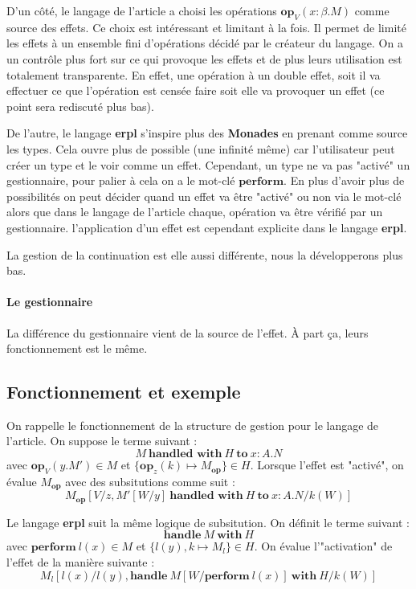 D'un côté, le langage de l'article a choisi les opérations $\textbf{op}_V(x:\beta.M)$ comme source des effets.
Ce choix est intéressant et limitant à la fois. Il permet de limité les effets à un ensemble fini d'opérations décidé par le créateur du langage. On a un contrôle plus fort sur ce qui provoque les effets et de plus leurs
utilisation est totalement transparente. En effet, une opération à un double effet, soit il va effectuer ce que l'opération
est censée faire soit elle va provoquer un effet (ce point sera rediscuté plus bas).

De l'autre, le langage \textbf{erpl} s'inspire plus des \textbf{Monades} en prenant comme source les types. Cela ouvre
plus de possible (une infinité même) car l'utilisateur peut créer un type et le voir comme un effet. Cependant, un type ne va
pas "activé" un gestionnaire, pour palier à cela on a le mot-clé $\textbf{perform}$. En plus d'avoir plus de possibilités
on peut décider quand un effet va être "activé" ou non via le mot-clé alors que dans le langage de l'article chaque, opération 
va être vérifié par un gestionnaire. l'application d'un effet est cependant explicite dans le langage \textbf{erpl}.

La gestion de la continuation est elle aussi différente, nous la développerons plus bas.

\paragraph{Le gestionnaire} La différence du gestionnaire vient de la source de l'effet. À part ça, leurs fonctionnement
est le même.

\subsection{Fonctionnement et exemple}

On rappelle le fonctionnement de la structure de gestion pour le langage de l'article. On suppose
le terme suivant : 
    \[M~\textbf{handled~with}~H~\textbf{to}~x:A.N\]
avec $\textbf{op}_V(y.M') \in M$ et $\{\textbf{op}_z(k) \mapsto M_\textbf{op}\} \in H$. Lorsque l'effet
est "activé", on évalue $M_\textbf{op}$ avec des subsitutions comme suit : 
    \[M_\textbf{op}[V/z,M'[W/y]~\textbf{handled~with}~H~\textbf{to}~x:A.N/k(W)]\]
\bigbreak

Le langage \textbf{erpl} suit la même logique de subsitution. On définit le terme suivant :
    \[\textbf{handle}~M~\textbf{with}~H\]
avec $\textbf{perform}~l(x) \in M$ et $\{ l(y),k \mapsto M_l\} \in H$. On évalue l'"activation" de l'effet de
la manière suivante : 
    \[M_l[l(x)/l(y),\textbf{handle}~M[W/\textbf{perform}~l(x)]~\textbf{with}~H/k(W)]\]



